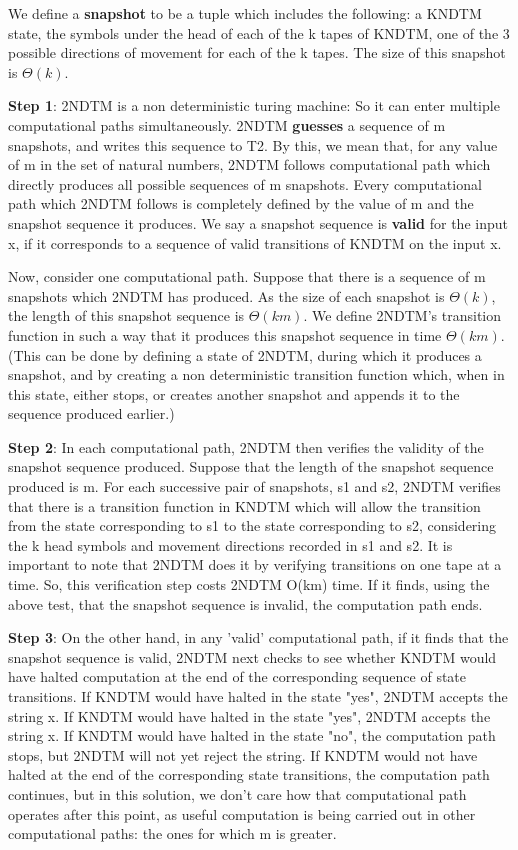 \documentclass[10pt]{article}
\begin{document}
We define a \textbf{snapshot} to be a tuple which includes the following: a KNDTM state, the symbols under the head of each of the k tapes of KNDTM, one of the 3 possible directions of movement for each of the k tapes. The size of this snapshot is $\Theta(k)$.

\textbf{Step 1}: 2NDTM is a non deterministic turing machine: So it can enter multiple computational paths simultaneously. 2NDTM \textbf{guesses} a sequence of m snapshots, and writes this sequence to T2. By this, we mean that, for any value of m in the set of natural numbers, 2NDTM follows computational path which directly produces all possible sequences of m snapshots. Every computational path which 2NDTM follows is completely defined by the value of m and the snapshot sequence it produces. We say a snapshot sequence is \textbf{valid} for the input x, if it corresponds to a sequence of valid transitions of KNDTM on the input x.

Now, consider one computational path. Suppose that there is a sequence of m snapshots which 2NDTM has produced. As the size of each snapshot is $\Theta(k)$, the length of this snapshot sequence is $\Theta(km)$. We define 2NDTM's transition function in such a way that it produces this snapshot sequence in time $\Theta(km)$. (This can be done by defining a state of 2NDTM, during which it produces a snapshot, and by creating a non deterministic transition function which, when in this state, either stops, or creates another snapshot and appends it to the sequence produced earlier.)

\textbf{Step 2}: In each computational path, 2NDTM then verifies the validity of the snapshot sequence produced. Suppose that the length of the snapshot sequence produced is m. For each successive pair of snapshots, s1 and s2, 2NDTM verifies that there is a transition function in KNDTM which will allow the transition from the state corresponding to s1 to the state corresponding to s2, considering the k head symbols and movement directions recorded in s1 and s2. It is important to note that 2NDTM does it by verifying transitions on one tape at a time. So, this verification step costs 2NDTM O(km) time. If it finds, using the above test, that the snapshot sequence is invalid, the computation path ends.

\textbf{Step 3}: On the other hand, in any 'valid' computational path, if it finds that the snapshot sequence is valid, 2NDTM next checks to see whether KNDTM would have halted computation at the end of the corresponding sequence of state transitions. If KNDTM would have halted in the state "yes", 2NDTM accepts the string x. If KNDTM would have halted in the state "yes", 2NDTM accepts the string x. If KNDTM would have halted in the state "no", the computation path stops, but 2NDTM will not yet reject the string. If KNDTM would not have halted at the end of the corresponding state transitions, the computation path continues, but in this solution, we don't care how that computational path operates after this point, as useful computation is being carried out in other computational paths: the ones for which m is greater.
\end{document}
